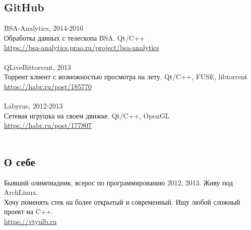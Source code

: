 \documentclass[a4paper, 12pt]{article}
\begin{document}
{    \subsection*{GitHub} {    
        BSA-Analytics, 2014-2016 \\
        Обработка данных с телескопа BSA. Qt/C++ \\
        \href{https://bsa-analytics.prao.ru/project/bsa-analytics}{https://bsa-analytics.prao.ru/project/bsa-analytics} \\ \\
        QLiveBittorrent, 2013 \\
        Торрент клиент с  возможностью просмотра на лету. Qt/C++, FUSE, libtorrent \\
        \href{https://habr.ru/post/185770}{https://habr.ru/post/185770}\\ \\
        Labyrus, 2012-2013 \\
        Сетевая игрушка на своем движке. Qt/C++, OpenGL \\
        \href{https://habr.ru/post/177807}{https://habr.ru/post/177807}\\ \\
    }
    
    \subsection*{О себе} {
        Бывший олимпиадник, всерос по программированию 2012, 2013. Живу под ArchLinux. \\
        Хочу поменять стек на более открытый и современный. Ищу любой сложный проект на C++. \\
        \href{https://vtyulb.ru}{https://vtyulb.ru} \\
    }
}
\end{document}
